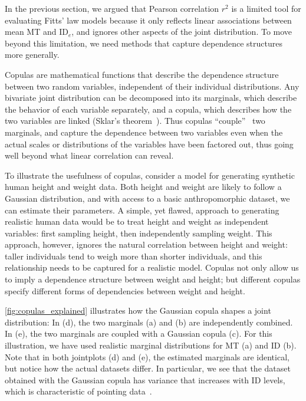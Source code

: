 \documentclass[acmlarge, manuscript,review]{acmart}
\begin{document}
In the previous section, we argued that Pearson correlation $r^2$ is a limited tool for evaluating Fitts' law models because it only reflects linear associations between mean MT and ID$_e$, and ignores other aspects of the joint distribution. To move beyond this limitation, we need methods that capture dependence structures more generally.


Copulas are mathematical functions that describe the dependence structure between two random variables, independent of their individual distributions. Any bivariate joint distribution can be decomposed into its marginals, which describe the behavior of each variable separately, and a copula, which describes how the two variables are linked (Sklar's theorem~\cite{nelsen2006}). Thus copulas ``couple''~\cite[Chapter 1]{nelsen2006} two marginals, and capture the dependence between two variables even when the actual scales or distributions of the variables have been factored out, thus going well beyond what linear correlation can reveal.



To illustrate the usefulness of copulas, consider a model for generating synthetic human height and weight data. Both height and weight are likely to follow a Gaussian distribution, and with access to a basic anthropomorphic dataset, we can estimate their parameters. 
A simple, yet flawed, approach to generating realistic human data would be to treat height and weight as independent variables: first sampling height, then independently sampling weight. This approach, however, ignores the natural correlation between height and weight: taller individuals tend to weigh more than shorter individuals, and this relationship needs to be captured for a realistic model.
Copulas not only allow us to imply a dependence structure between weight and height; but different copulas specify different forms of dependencies between weight and height.


\autoref{fig:copulas_explained} illustrates how the Gaussian copula shapes a joint distribution: In (d), the two marginals (a) and (b) are independently combined. In (e), the two marginals are coupled with a Gaussian copula (c). For this illustration, we have used realistic marginal distributions for MT (a) and ID (b). Note that in both jointplots (d) and (e), the estimated marginals are identical, but notice how the actual datasets differ. In particular, we see that the dataset obtained with the Gaussian copula has variance that increases with ID levels, which is characteristic of pointing data~\cite{gori2018these}.
\end{document}
